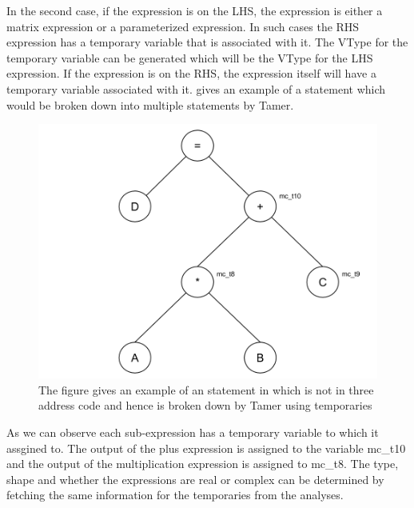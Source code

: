 In the second case, if the expression is on the LHS, the expression is either a matrix expression or a parameterized expression. In such cases the RHS expression has a temporary variable that is associated with it. The VType for the temporary variable can be generated which will be the VType for the LHS expression. If the expression is on the RHS, the expression itself will have a temporary variable associated with it.  gives an example of a statement which would be broken down into multiple statements by Tamer. 
\begin{figure}[htbp]
\begin{center}
\includegraphics[scale=0.5]{Figures/tac.png}
\caption[Statement in \matlab that is not three address code]{The figure gives an example of an statement in \matlab which is not in three address code and hence is broken down by Tamer using temporaries}
\label{Fig:tac}
\end{center}
\end{figure}
As we can observe each sub-expression has a temporary variable to which it assgined to. The output of the plus expression is assigned to the variable \textsf{mc\_t10} and the output of the multiplication expression is assigned to \textsf{mc\_t8}. The type, shape and whether the expressions are real or complex can be determined by fetching the same information for the temporaries from the analyses. 
